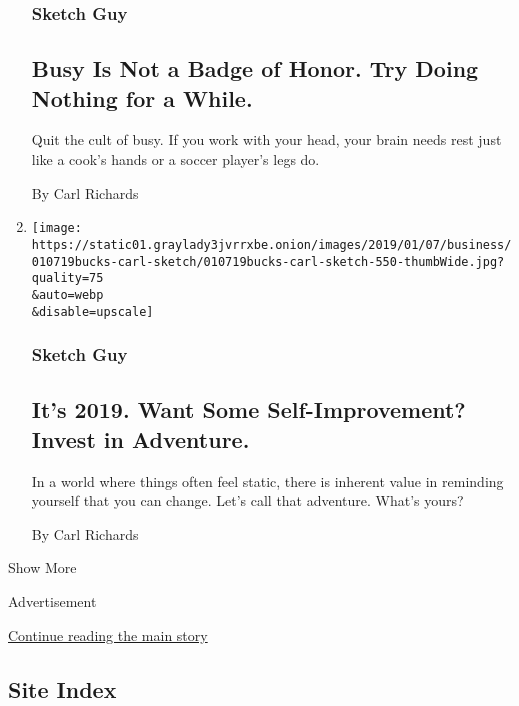\begin{enumerate}
{  \subsubsection{Sketch Guy}\label{sketch-guy-8}}

  \hypertarget{busy-is-not-a-badge-of-honor-try-doing-nothing-for-a-while}{%
  \subsection{Busy Is Not a Badge of Honor. Try Doing Nothing for a
  While.}\label{busy-is-not-a-badge-of-honor-try-doing-nothing-for-a-while}}

  Quit the cult of busy. If you work with your head, your brain needs
  rest just like a cook's hands or a soccer player's legs do.

  By Carl Richards
\item
  \href{/2019/01/07/your-money/2019-self-improvement-adventure.html}{}

  \texttt{[image: https://static01.graylady3jvrrxbe.onion/images/2019/01/07/business/010719bucks-carl-sketch/010719bucks-carl-sketch-550-thumbWide.jpg?quality=75\\\&auto=webp\\\&disable=upscale]}

  \hypertarget{sketch-guy-9}{%
  \subsubsection{Sketch Guy}\label{sketch-guy-9}}

  \hypertarget{its-2019-want-some-self-improvement-invest-in-adventure}{%
  \subsection{It's 2019. Want Some Self-Improvement? Invest in
  Adventure.}\label{its-2019-want-some-self-improvement-invest-in-adventure}}

  In a world where things often feel static, there is inherent value in
  reminding yourself that you can change. Let's call that adventure.
  What's yours?

  By Carl Richards
\end{enumerate}

Show More

Advertisement

\protect\hyperlink{after-mid2}{Continue reading the main story}

\hypertarget{site-index}{%
\subsection{Site Index}\label{site-index}}

